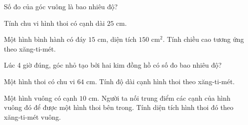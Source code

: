 \begin{ex} %
Số đo của góc vuông là bao nhiêu độ?
\end{ex}

\begin{ex} %
Tính chu vi hình thoi có cạnh dài $25\text{ cm}$.
\end{ex}

\begin{ex} %
Một hình bình hành có đáy $15\text{ cm}$, diện tích $150\text{ cm}^2$. Tính chiều cao tương ứng theo xăng-ti-mét.
\end{ex}

\begin{ex} %
Lúc 4 giờ đúng, góc nhỏ tạo bởi hai kim đồng hồ có số đo bao nhiêu độ?
\end{ex}

\begin{ex} %
Một hình thoi có chu vi $64\text{ cm}$. Tính độ dài cạnh hình thoi theo xăng-ti-mét.
\end{ex}

\begin{ex} %
Một hình vuông có cạnh $10\text{ cm}$. Người ta nối trung điểm các cạnh của hình vuông đó để được một hình thoi bên trong. Tính diện tích hình thoi đó theo xăng-ti-mét vuông.
\end{ex}
